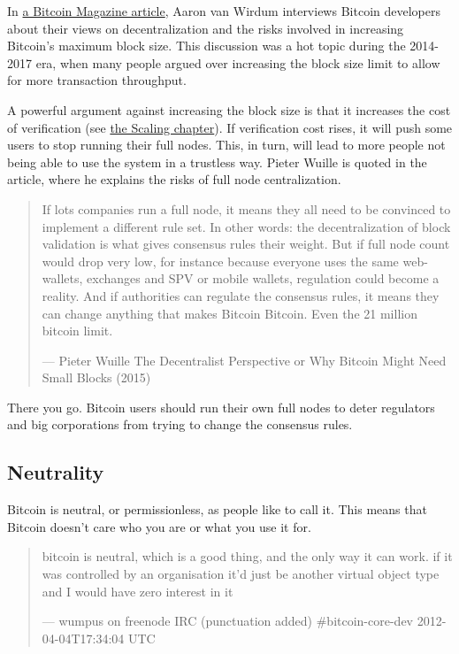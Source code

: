 In
\href{https://bitcoinmagazine.com/technical/decentralist-perspective-bitcoin-might-need-small-blocks-1442090446}{a
Bitcoin Magazine article}, Aaron van Wirdum interviews Bitcoin
developers about their views on decentralization and the risks involved
in increasing Bitcoin's maximum block size. This discussion was a hot
topic during the 2014-2017 era, when many people argued over increasing
the block size limit to allow for more transaction throughput.

A powerful argument against increasing the block size is that it
increases the cost of verification (see
\protect\hyperlink{verticalscaling}{the Scaling chapter}). If
verification cost rises, it will push some users to stop running their
full nodes. This, in turn, will lead to more people not being able to
use the system in a trustless way. Pieter Wuille is quoted in the
article, where he explains the risks of full node centralization.

\begin{quote}
If lots companies run a full node, it means they all need to be
convinced to implement a different rule set. In other words: the
decentralization of block validation is what gives consensus rules their
weight. But if full node count would drop very low, for instance because
everyone uses the same web-wallets, exchanges and SPV or mobile wallets,
regulation could become a reality. And if authorities can regulate the
consensus rules, it means they can change anything that makes Bitcoin
Bitcoin. Even the 21 million bitcoin limit.

---  Pieter Wuille The Decentralist Perspective or Why Bitcoin Might
Need Small Blocks (2015)
\end{quote}

There you go. Bitcoin users should run their own full nodes to deter
regulators and big corporations from trying to change the consensus
rules.

\hypertarget{neutrality}{%
\subsection{Neutrality}\label{neutrality}}

Bitcoin is neutral, or permissionless, as people like to call it. This
means that Bitcoin doesn't care who you are or what you use it for.

\begin{quote}
bitcoin is neutral, which is a good thing, and the only way it can work.
if it was controlled by an organisation it'd just be another virtual
object type and I would have zero interest in it

---  wumpus on freenode IRC (punctuation added) \#bitcoin-core-dev
2012-04-04T17:34:04 UTC
\end{quote}

